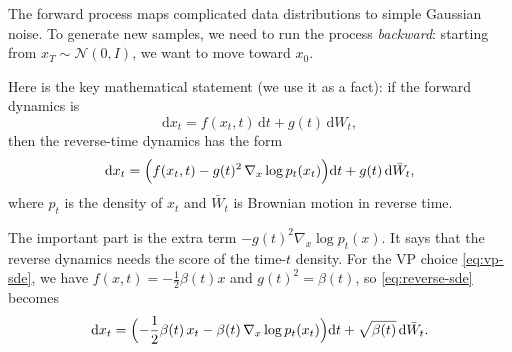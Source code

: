 \documentclass[../main]{subfiles}
\begin{document}
The forward process maps complicated data distributions to simple Gaussian noise.
To generate new samples, we need to run the process \emph{backward}:
starting from $x_T\sim\mathcal N(0,I)$, we want to move toward $x_0$.

Here is the key mathematical statement (we use it as a fact):
if the forward dynamics is
\begin{equation}\label{eq:general-sde}
    \mathrm d x_t = f(x_t,t)\,\mathrm dt + g(t)\,\mathrm d W_t,
\end{equation}
then the reverse-time dynamics has the form
\begin{equation}\label{eq:reverse-sde}
    \mathrm d x_t
    =
    \Bigl(f(x_t,t) - g(t)^2\,\nabla_x\log p_t(x_t)\Bigr)\mathrm dt
    +
    g(t)\,\mathrm d \bar W_t,
\end{equation}
where $p_t$ is the density of $x_t$ and $\bar W_t$ is Brownian motion in reverse time.

The important part is the extra term $-g(t)^2\nabla_x\log p_t(x)$. It says that the reverse dynamics
needs the score of the time-$t$ density. For the VP choice \eqref{eq:vp-sde}, we have
$f(x,t)=-\frac12\beta(t)x$ and $g(t)^2=\beta(t)$, so \eqref{eq:reverse-sde} becomes
\begin{equation}\label{eq:reverse-vp}
    \mathrm d x_t
    =
    \Bigl(-\frac12\beta(t)\,x_t - \beta(t)\,\nabla_x\log p_t(x_t)\Bigr)\mathrm dt
    +
    \sqrt{\beta(t)}\,\mathrm d \bar W_t.
\end{equation}
\end{document}
